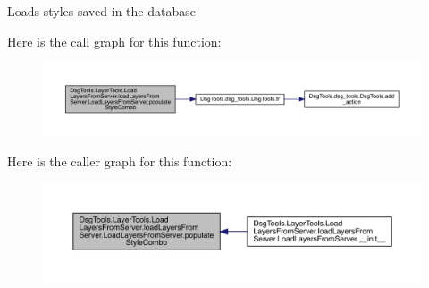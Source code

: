\begin{DoxyVerb}Loads styles saved in the database
\end{DoxyVerb}
 Here is the call graph for this function\+:
\nopagebreak
\begin{figure}[H]
\begin{center}
\leavevmode
\includegraphics[width=350pt]{class_dsg_tools_1_1_layer_tools_1_1_load_layers_from_server_1_1load_layers_from_server_1_1_load_layers_from_server_a391c45effce3c8b0122adf2f10cd600b_cgraph}
\end{center}
\end{figure}
Here is the caller graph for this function\+:
\nopagebreak
\begin{figure}[H]
\begin{center}
\leavevmode
\includegraphics[width=350pt]{class_dsg_tools_1_1_layer_tools_1_1_load_layers_from_server_1_1load_layers_from_server_1_1_load_layers_from_server_a391c45effce3c8b0122adf2f10cd600b_icgraph}
\end{center}
\end{figure}
\mbox{\label{class_dsg_tools_1_1_layer_tools_1_1_load_layers_from_server_1_1load_layers_from_server_1_1_load_layers_from_server_a46e887979f70b98f488e3b0aef33c214}} 
